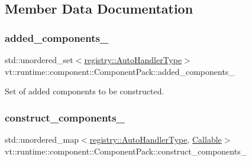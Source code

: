 \subsection{Member Data Documentation}
\mbox{\label{structvt_1_1runtime_1_1component_1_1_component_pack_aebf0761f1902a5336a247190ad8ba47d}} 
\subsubsection{\texorpdfstring{added\+\_\+components\+\_\+}{added\_components\_}}
{\footnotesize\ttfamily std\+::unordered\+\_\+set$<$\hyperlink{namespacevt_1_1runtime_1_1component_1_1registry_a9b86518797c7bb91babf0ca8ee7d06e6}{registry\+::\+Auto\+Handler\+Type}$>$ vt\+::runtime\+::component\+::\+Component\+Pack\+::added\+\_\+components\+\_\+\hspace{0.3cm}{\ttfamily [private]}}



Set of added components to be constructed. 

\mbox{\label{structvt_1_1runtime_1_1component_1_1_component_pack_a94303b85754dae6c7442bdd3de41829f}} 
\subsubsection{\texorpdfstring{construct\+\_\+components\+\_\+}{construct\_components\_}}
{\footnotesize\ttfamily std\+::unordered\+\_\+map$<$\hyperlink{namespacevt_1_1runtime_1_1component_1_1registry_a9b86518797c7bb91babf0ca8ee7d06e6}{registry\+::\+Auto\+Handler\+Type}, \hyperlink{structvt_1_1runtime_1_1component_1_1_component_pack_aa4389ab338cdac3a8900a9e777c0d3c9}{Callable}$>$ vt\+::runtime\+::component\+::\+Component\+Pack\+::construct\+\_\+components\+\_\+\hspace{0.3cm}{\ttfamily [private]}}



